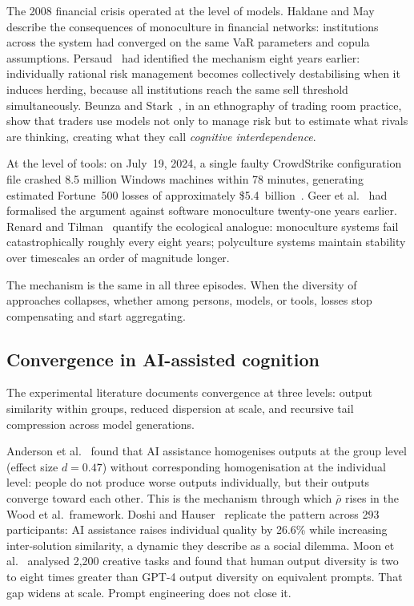 \documentclass[11pt,a4paper]{article}
\begin{document}
The 2008 financial crisis operated at the level of
models. Haldane and May~\cite{haldane_nature_2011} describe the consequences
of monoculture in financial networks: institutions across the system had
converged on the same VaR parameters and copula
assumptions. Persaud~\cite{persaud_jrf_2000} had identified the mechanism
eight years earlier: individually rational risk management becomes
collectively destabilising when it induces herding, because all institutions
reach the same sell threshold simultaneously. Beunza and
Stark~\cite{beunza_econsoc_2012}, in an ethnography of trading room
practice, show that traders use models not only to manage risk but to
estimate what rivals are thinking, creating what they call \textit{cognitive
interdependence}.

At the level of tools: on July~19, 2024, a single faulty CrowdStrike
configuration file crashed 8.5 million Windows machines within 78 minutes,
generating estimated Fortune~500 losses of approximately
\$5.4~billion~\cite{parametrix_crowdstrike_2024}. Geer et
al.~\cite{geer_ccia_2003} had formalised the argument against software
monoculture twenty-one years earlier. Renard and
Tilman~\cite{renard_nature_2019} quantify the ecological analogue:
monoculture systems fail catastrophically roughly every eight years;
polyculture systems maintain stability over timescales an order of magnitude
longer.

The mechanism is the same in all three episodes. When the diversity of
approaches collapses, whether among persons, models, or tools, losses stop
compensating and start aggregating.

\subsection{Convergence in AI-assisted cognition}

The experimental literature documents convergence at three levels: output
similarity within groups, reduced dispersion at scale, and recursive tail
compression across model generations.

Anderson et al.~\cite{anderson_cc24} found that AI assistance homogenises
outputs at the group level (effect size $d = 0.47$) without corresponding
homogenisation at the individual level: people do not produce worse outputs
individually, but their outputs converge toward each other. This is the
mechanism through which $\bar{\rho}$ rises in the Wood et al.\ framework.
Doshi and Hauser~\cite{doshi_sciadv_2024} replicate the pattern across 293
participants: AI assistance raises individual quality by 26.6\% while
increasing inter-solution similarity, a dynamic they describe as a social
dilemma. Moon et al.~\cite{moon_chbai_2025} analysed 2,200 creative tasks
and found that human output diversity is two to eight times greater than
GPT-4 output diversity on equivalent prompts. That gap widens at scale.
Prompt engineering does not close it.
\end{document}
